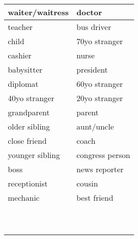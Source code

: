 \documentclass{article}
\date{}
\begin{document}
  \centering
  \noindent
  {\LARGE
    \begin{tabular}{| p{} | p{} |}
      \hline
      waiter/waitress  & doctor \\
      \hline
      teacher          & bus driver \\
      \hline
      child            & 70yo stranger \\
      \hline
      cashier          & nurse \\
      \hline
      babysitter       & president \\
      \hline
      diplomat         & 60yo stranger \\
      \hline
      40yo stranger    & 20yo stranger \\
      \hline
      grandparent      & parent \\
      \hline
      older sibling    & aunt/uncle \\
      \hline
      close friend     & coach \\
      \hline
      younger sibling  & congress person \\
      \hline
      boss             & news reporter \\
      \hline
      receptionist     & cousin \\
      \hline
      mechanic         & best friend \\
      \hline
                       & \\
      \hline
                       & \\
      \hline
                       & \\
      \hline
                       & \\
      \hline
                       & \\
      \hline
                       & \\
      \hline
                       & \\
      \hline
                       & \\
      \hline
                       & \\
      \hline
                       & \\
      \hline
    \end{tabular}
  }
\end{document}
